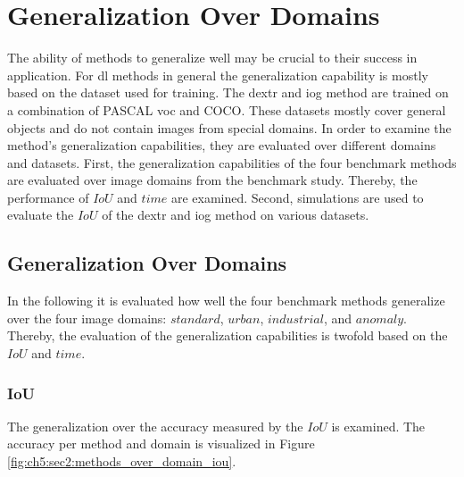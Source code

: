 
\section{Generalization Over Domains} \label{ord:ch5:sec2_generalization_image_domains}
The ability of methods to generalize well may be crucial to their success in application.
For \gls{dl} methods in general the generalization capability is mostly based on the dataset used for training.
The \gls{dextr} and \gls{iog} method are trained on a combination of PASCAL \gls{voc} and COCO.
These datasets mostly cover general objects and do not contain images from special domains.
In order to examine the method's generalization capabilities, they are evaluated over different domains and datasets.
First, the generalization capabilities of the four benchmark methods are evaluated over image domains from the benchmark study.
Thereby, the performance of $ IoU $ and $ time $ are examined.
Second, simulations are used to evaluate the $ IoU $ of the \gls{dextr} and \gls{iog} method on various datasets.

\subsection{Generalization Over Domains}
In the following it is evaluated how well the four benchmark methods generalize over the four image domains: $ standard $, $ urban $, $ industrial $, and $ anomaly $.
Thereby, the evaluation of the generalization capabilities is twofold based on the $ IoU $ and $ time $.

\subsubsection{IoU}
The generalization over the accuracy measured by the $ IoU $ is examined.
The accuracy per method and domain is visualized in Figure \ref{fig:ch5:sec2:methods_over_domain_iou}.

